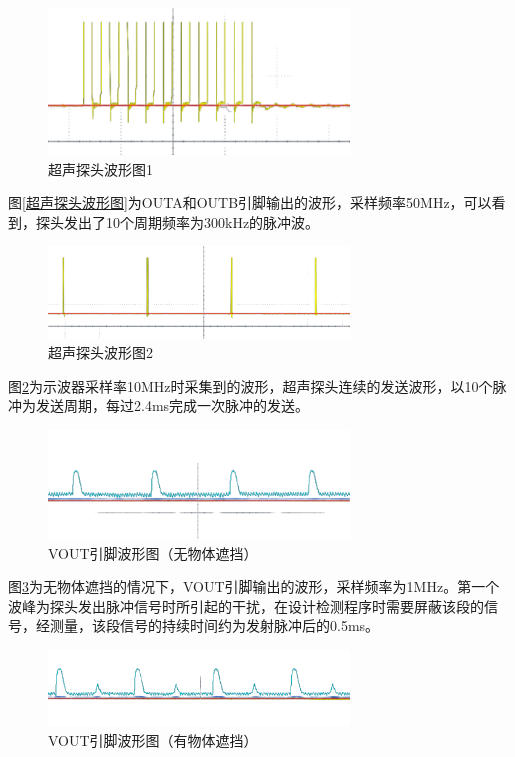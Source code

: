  \begin{figure}[ht]
	    \centering
	    \includegraphics[width=8cm]{figure/debug waveform3.png}
	    \caption{超声探头波形图1}
	    \label{超声探头波形图1}
	\end{figure}
 图\ref{超声探头波形图}为OUTA和OUTB引脚输出的波形，采样频率50MHz，可以看到，探头发出了10个周期频率为300kHz的脉冲波。
  \begin{figure}[ht]
	    \centering
	    \includegraphics[width=8cm]{figure/debug waveform4.png}
	    \caption{超声探头波形图2}
	    \label{超声探头波形图2}
	\end{figure}
 图\ref{超声探头波形图2}为示波器采样率10MHz时采集到的波形，超声探头连续的发送波形，以10个脉冲为发送周期，每过2.4ms完成一次脉冲的发送。
 \begin{figure}[ht]
	    \centering
	    \includegraphics[width=8cm]{figure/debug waveform5.png}
	    \caption{VOUT引脚波形图（无物体遮挡）}
	    \label{VOUT引脚波形图（无物体遮挡）}
	\end{figure}
 图\ref{VOUT引脚波形图（无物体遮挡）}为无物体遮挡的情况下，VOUT引脚输出的波形，采样频率为1MHz。第一个波峰为探头发出脉冲信号时所引起的干扰，在设计检测程序时需要屏蔽该段的信号，经测量，该段信号的持续时间约为发射脉冲后的0.5ms。
 \begin{figure}[ht]
	    \centering
	    \includegraphics[width=8cm]{figure/debug waveform6.png}
	    \caption{VOUT引脚波形图（有物体遮挡）}
	    \label{VOUT引脚波形图（有物体遮挡）}
	\end{figure}
